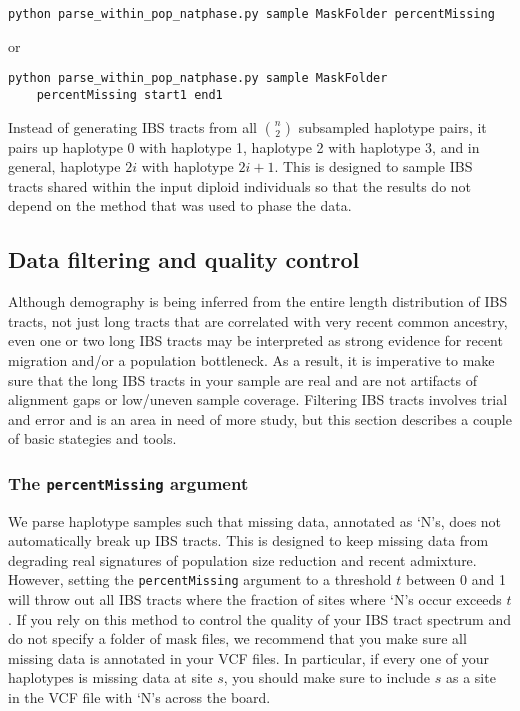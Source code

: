 \documentclass[12pt]{article}
\begin{document}
\begin{enumerate}
\begin{verbatim}
python parse_within_pop_natphase.py sample MaskFolder percentMissing
\end{verbatim}

or


\begin{Verbatim}
python parse_within_pop_natphase.py sample MaskFolder 
	percentMissing start1 end1
\end{Verbatim}

Instead of generating IBS tracts from all $\binom{n}{2}$ subsampled haplotype pairs, it pairs up haplotype 0 with haplotype 1, haplotype 2 with haplotype 3, and in general, haplotype $2i$ with haplotype $2i+1$. This is designed to sample IBS tracts shared within the input diploid individuals so that the results do not depend on the method that was used to phase the data. 


\end{enumerate} 

\subsection{Data filtering and quality control}\label{filtering}
Although demography is being inferred from the entire length distribution of IBS tracts, not just long tracts that are correlated with very recent common ancestry, even one or two long IBS tracts may be interpreted as strong evidence for recent migration and/or a population bottleneck. As a result, it is imperative to make sure that the long IBS tracts in your sample are real and are not artifacts of alignment gaps or low/uneven sample coverage. Filtering IBS tracts involves trial and error and is an area in need of more study, but this section describes a couple of basic stategies and tools.

\subsubsection{The \texttt{percentMissing} argument}
We parse haplotype samples such that missing data, annotated as `N's, does not automatically break up IBS tracts. This is designed to keep missing data from degrading real signatures of population size reduction and recent admixture. However, setting the \texttt{percentMissing} argument to a threshold $t$ between 0 and 1 will throw out all IBS tracts where the fraction of sites where `N's occur exceeds $t$. If you rely on this method to control the quality of your IBS tract spectrum and do not specify a folder of mask files, we recommend that you make sure all missing data is annotated in your VCF files. In particular, if every one of your haplotypes is missing data at site $s$, you should make sure to include $s$ as a site in the VCF file with `N's across the board. 
\end{document}
